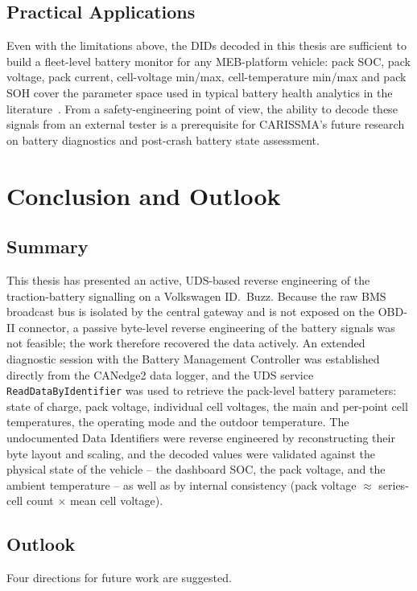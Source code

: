 \documentclass[11pt,a4paper,oneside,parskip=half]{scrreprt}
\begin{document}
\section{Practical Applications}
Even with the limitations above, the DIDs decoded in this thesis are sufficient to build a fleet-level battery monitor for any MEB-platform vehicle: pack SOC, pack voltage, pack current, cell-voltage min/max, cell-temperature min/max and pack SOH cover the parameter space used in typical battery health analytics in the literature~\cite{weng2014unified,park2021data}. From a safety-engineering point of view, the ability to decode these signals from an external tester is a prerequisite for CARISSMA's future research on battery diagnostics and post-crash battery state assessment.

\chapter{Conclusion and Outlook}
\section{Summary}
This thesis has presented an active, UDS-based reverse engineering of the traction-battery signalling on a Volkswagen ID.~Buzz. Because the raw BMS broadcast bus is isolated by the central gateway and is not exposed on the OBD-II connector, a passive byte-level reverse engineering of the battery signals was not feasible; the work therefore recovered the data actively. An extended diagnostic session with the Battery Management Controller was established directly from the CANedge2 data logger, and the UDS service \texttt{ReadDataByIdentifier} was used to retrieve the pack-level battery parameters: state of charge, pack voltage, individual cell voltages, the main and per-point cell temperatures, the operating mode and the outdoor temperature. The undocumented Data Identifiers were reverse engineered by reconstructing their byte layout and scaling, and the decoded values were validated against the physical state of the vehicle -- the dashboard SOC, the pack voltage, and the ambient temperature -- as well as by internal consistency (pack voltage $\approx$ series-cell count $\times$ mean cell voltage).

\section{Outlook}
Four directions for future work are suggested.
\end{document}
